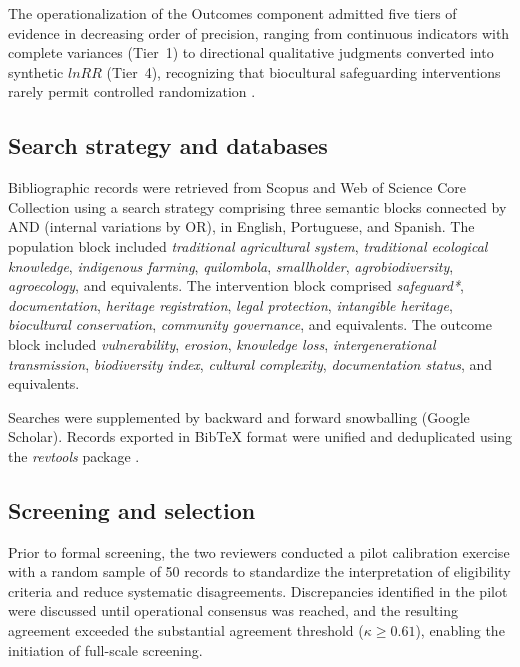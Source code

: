 \documentclass[12pt,a4paper]{article}
\begin{document}
The operationalization of the Outcomes component admitted five tiers of evidence in decreasing order of precision, ranging from continuous indicators with complete variances (Tier~1) to directional qualitative judgments converted into synthetic $lnRR$ (Tier~4), recognizing that biocultural safeguarding interventions rarely permit controlled randomization \citep{Shadish2002}.

\subsection{Search strategy and databases}
\label{sec:search}

Bibliographic records were retrieved from Scopus and Web of Science Core Collection using a search strategy comprising three semantic blocks connected by AND (internal variations by OR), in English, Portuguese, and Spanish. The population block included \textit{traditional agricultural system}, \textit{traditional ecological knowledge}, \textit{indigenous farming}, \textit{quilombola}, \textit{smallholder}, \textit{agrobiodiversity}, \textit{agroecology}, and equivalents. The intervention block comprised \textit{safeguard*}, \textit{documentation}, \textit{heritage registration}, \textit{legal protection}, \textit{intangible heritage}, \textit{biocultural conservation}, \textit{community governance}, and equivalents. The outcome block included \textit{vulnerability}, \textit{erosion}, \textit{knowledge loss}, \textit{intergenerational transmission}, \textit{biodiversity index}, \textit{cultural complexity}, \textit{documentation status}, and equivalents.

Searches were supplemented by backward and forward snowballing (Google Scholar). Records exported in BibTeX format were unified and deduplicated using the \textit{revtools} package \citep{Westgate2019}.

\subsection{Screening and selection}
\label{sec:screening}

Prior to formal screening, the two reviewers conducted a pilot calibration exercise with a random sample of 50 records to standardize the interpretation of eligibility criteria and reduce systematic disagreements. Discrepancies identified in the pilot were discussed until operational consensus was reached, and the resulting agreement exceeded the substantial agreement threshold ($\kappa \geq 0.61$), enabling the initiation of full-scale screening.
\end{document}
